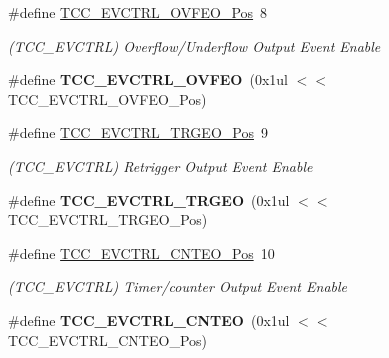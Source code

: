 \begin{DoxyCompactItemize}
\item 
\hypertarget{group___s_a_m_l21___t_c_c_ga8bb76197d891216a3ed5b55209e37ae1}{}\#define \hyperlink{group___s_a_m_l21___t_c_c_ga8bb76197d891216a3ed5b55209e37ae1}{T\+C\+C\+\_\+\+E\+V\+C\+T\+R\+L\+\_\+\+O\+V\+F\+E\+O\+\_\+\+Pos}~8\label{group___s_a_m_l21___t_c_c_ga8bb76197d891216a3ed5b55209e37ae1}

\begin{DoxyCompactList}\small\item\em (T\+C\+C\+\_\+\+E\+V\+C\+T\+R\+L) Overflow/\+Underflow Output Event Enable \end{DoxyCompactList}\item 
\hypertarget{group___s_a_m_l21___t_c_c_gab395472e842784538c5135488d88bc66}{}\#define {\bfseries T\+C\+C\+\_\+\+E\+V\+C\+T\+R\+L\+\_\+\+O\+V\+F\+E\+O}~(0x1ul $<$$<$ T\+C\+C\+\_\+\+E\+V\+C\+T\+R\+L\+\_\+\+O\+V\+F\+E\+O\+\_\+\+Pos)\label{group___s_a_m_l21___t_c_c_gab395472e842784538c5135488d88bc66}

\item 
\hypertarget{group___s_a_m_l21___t_c_c_ga9a8c1fcab507cdd4ff956a7326e7a28f}{}\#define \hyperlink{group___s_a_m_l21___t_c_c_ga9a8c1fcab507cdd4ff956a7326e7a28f}{T\+C\+C\+\_\+\+E\+V\+C\+T\+R\+L\+\_\+\+T\+R\+G\+E\+O\+\_\+\+Pos}~9\label{group___s_a_m_l21___t_c_c_ga9a8c1fcab507cdd4ff956a7326e7a28f}

\begin{DoxyCompactList}\small\item\em (T\+C\+C\+\_\+\+E\+V\+C\+T\+R\+L) Retrigger Output Event Enable \end{DoxyCompactList}\item 
\hypertarget{group___s_a_m_l21___t_c_c_ga7bd9afcc39a5e717c2db4913217c29f0}{}\#define {\bfseries T\+C\+C\+\_\+\+E\+V\+C\+T\+R\+L\+\_\+\+T\+R\+G\+E\+O}~(0x1ul $<$$<$ T\+C\+C\+\_\+\+E\+V\+C\+T\+R\+L\+\_\+\+T\+R\+G\+E\+O\+\_\+\+Pos)\label{group___s_a_m_l21___t_c_c_ga7bd9afcc39a5e717c2db4913217c29f0}

\item 
\hypertarget{group___s_a_m_l21___t_c_c_ga118b43f2ae9e485d623a4dc50a2bf501}{}\#define \hyperlink{group___s_a_m_l21___t_c_c_ga118b43f2ae9e485d623a4dc50a2bf501}{T\+C\+C\+\_\+\+E\+V\+C\+T\+R\+L\+\_\+\+C\+N\+T\+E\+O\+\_\+\+Pos}~10\label{group___s_a_m_l21___t_c_c_ga118b43f2ae9e485d623a4dc50a2bf501}

\begin{DoxyCompactList}\small\item\em (T\+C\+C\+\_\+\+E\+V\+C\+T\+R\+L) Timer/counter Output Event Enable \end{DoxyCompactList}\item 
\hypertarget{group___s_a_m_l21___t_c_c_ga27858198165a6daba1c2ee4f83605d64}{}\#define {\bfseries T\+C\+C\+\_\+\+E\+V\+C\+T\+R\+L\+\_\+\+C\+N\+T\+E\+O}~(0x1ul $<$$<$ T\+C\+C\+\_\+\+E\+V\+C\+T\+R\+L\+\_\+\+C\+N\+T\+E\+O\+\_\+\+Pos)\label{group___s_a_m_l21___t_c_c_ga27858198165a6daba1c2ee4f83605d64}


\end{DoxyCompactItemize}
